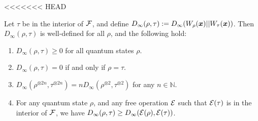 \documentclass[pra,
aps,
twocolumn,
superscriptaddress,
groupedaddress,
nofootinbib,
reprint
]{revtex4-1}
\begin{document}
<<<<<<< HEAD
\begin{theorem} Let $\tau$ be in the interior of ${\mathcal F}$, and define $D_\infty(\rho,\tau) := D_\infty(W_\rho(\boldsymbol{x}) || W_\tau (\boldsymbol{x}))$. Then $D_\infty(\rho, \tau)$ is well-defined for all $\rho$, and the following hold:
\begin{enumerate}
\item $D_\infty(\rho, \tau) \ge 0$ for all quantum states $\rho$.
\item  $D_\infty(\rho , \tau) = 0$ if and only if $\rho =\tau$.
\item $D_\infty(\rho^{\otimes 2n}, \tau^{\otimes 2n}) = n D_\infty(\rho^{\otimes 2} ,\tau^{\otimes 2})$ for any $n \in \mathbb{N}$.
\item For any quantum state $\rho$, and any free operation ${\mathcal E}$ such that ${\mathcal E}(\tau)$ is in the interior of ${\mathcal F}$, we have $D_\infty (\rho , \tau) \ge D_\infty ({\mathcal E}(\rho), {\mathcal E}(\tau))$.
\end{enumerate}
\end{theorem}
\end{document}
